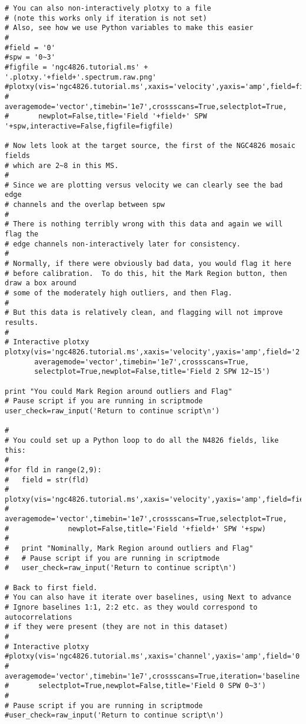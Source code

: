 \begin{verbatim}
# You can also non-interactively plotxy to a file
# (note this works only if iteration is not set)
# Also, see how we use Python variables to make this easier
#
#field = '0'
#spw = '0~3'
#figfile = 'ngc4826.tutorial.ms' + '.plotxy.'+field+'.spectrum.raw.png'
#plotxy(vis='ngc4826.tutorial.ms',xaxis='velocity',yaxis='amp',field=field,spw=spw,
#       averagemode='vector',timebin='1e7',crossscans=True,selectplot=True,
#       newplot=False,title='Field '+field+' SPW '+spw,interactive=False,figfile=figfile)

# Now lets look at the target source, the first of the NGC4826 mosaic fields
# which are 2~8 in this MS.
#
# Since we are plotting versus velocity we can clearly see the bad edge
# channels and the overlap between spw
#
# There is nothing terribly wrong with this data and again we will flag the
# edge channels non-interactively later for consistency.
#
# Normally, if there were obviously bad data, you would flag it here
# before calibration.  To do this, hit the Mark Region button, then draw a box around
# some of the moderately high outliers, and then Flag.
#
# But this data is relatively clean, and flagging will not improve results.
#
# Interactive plotxy
plotxy(vis='ngc4826.tutorial.ms',xaxis='velocity',yaxis='amp',field='2',spw='12~15',
       averagemode='vector',timebin='1e7',crossscans=True,
       selectplot=True,newplot=False,title='Field 2 SPW 12~15')

print "You could Mark Region around outliers and Flag"
# Pause script if you are running in scriptmode
user_check=raw_input('Return to continue script\n')

#
# You could set up a Python loop to do all the N4826 fields, like this:
#
#for fld in range(2,9):
#	field = str(fld)
#	plotxy(vis='ngc4826.tutorial.ms',xaxis='velocity',yaxis='amp',field=field,spw=spw,
#              averagemode='vector',timebin='1e7',crossscans=True,selectplot=True,
#              newplot=False,title='Field '+field+' SPW '+spw)
#
#	print "Nominally, Mark Region around outliers and Flag"
#	# Pause script if you are running in scriptmode
#	user_check=raw_input('Return to continue script\n')

# Back to first field.
# You can also have it iterate over baselines, using Next to advance
# Ignore baselines 1:1, 2:2 etc. as they would correspond to autocorrelations
# if they were present (they are not in this dataset)
#
# Interactive plotxy
#plotxy(vis='ngc4826.tutorial.ms',xaxis='channel',yaxis='amp',field='0',spw='0~3',
#       averagemode='vector',timebin='1e7',crossscans=True,iteration='baseline',
#       selectplot=True,newplot=False,title='Field 0 SPW 0~3')
#	
# Pause script if you are running in scriptmode
#user_check=raw_input('Return to continue script\n')


\end{verbatim}
